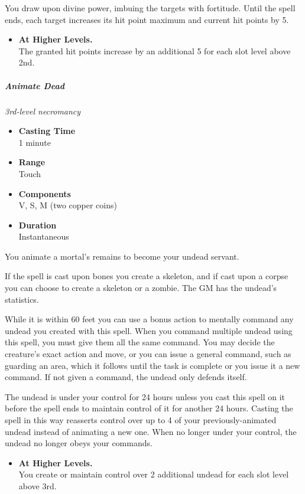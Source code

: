 You draw upon divine power, imbuing the targets with fortitude. Until
the spell ends, each target increases its hit point maximum and current
hit points by 5.

\begin{itemize}
\item
  \textbf{At Higher Levels.}\\
  The granted hit points increase by an additional 5 for each slot level
  above 2nd.
\end{itemize}

\subparagraph{Animate Dead}\label{Spell_Animate_Dead_animate-dead}

\emph{3rd-level necromancy}

\begin{itemize}
\item
  \textbf{Casting Time}\\
  1 minute
\item
  \textbf{Range}\\
  Touch
\item
  \textbf{Components}\\
  V, S, M (two copper coins)
\item
  \textbf{Duration}\\
  Instantaneous
\end{itemize}

You animate a mortal's remains to become your undead servant.

If the spell is cast upon bones you create a skeleton, and if cast upon
a corpse you can choose to create a skeleton or a zombie. The GM has the
undead's statistics.

While it is within 60 feet you can use a bonus action to mentally
command any undead you created with this spell. When you command
multiple undead using this spell, you must give them all the same
command. You may decide the creature's exact action and move, or you can
issue a general command, such as guarding an area, which it follows
until the task is complete or you issue it a new command. If not given a
command, the undead only defends itself.

The undead is under your control for 24 hours unless you cast this spell
on it before the spell ends to maintain control of it for another 24
hours. Casting the spell in this way reasserts control over up to 4 of
your previously-animated undead instead of animating a new one. When no
longer under your control, the undead no longer obeys your commands.

\begin{itemize}
\item
  \textbf{At Higher Levels.}\\
  You create or maintain control over 2 additional undead for each slot
  level above 3rd.
\end{itemize}

